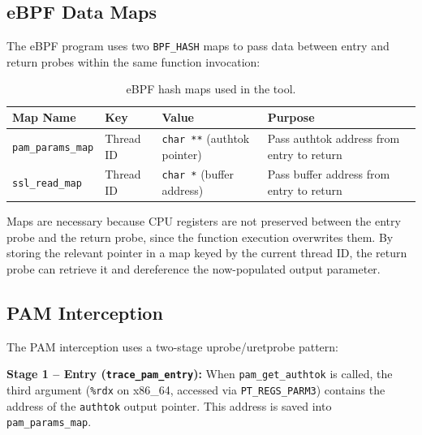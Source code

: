 \documentclass[11pt,a4paper]{article}
\begin{document}
\subsection{eBPF Data Maps}
\label{subsec:maps}

The eBPF program uses two \texttt{BPF\_HASH} maps to pass data between entry
and return probes within the same function invocation:

\begin{table}[H]
\centering
\caption{eBPF hash maps used in the tool.}
\label{tab:maps}
\begin{tabularx}{\textwidth}{@{}lllX@{}}
\toprule
\textbf{Map Name}      & \textbf{Key}  & \textbf{Value}      & \textbf{Purpose} \\
\midrule
\texttt{pam\_params\_map} & Thread ID & \texttt{char **} (authtok pointer) & Pass authtok address from entry to return \\
\texttt{ssl\_read\_map}   & Thread ID & \texttt{char *} (buffer address)   & Pass buffer address from entry to return \\
\bottomrule
\end{tabularx}
\end{table}

Maps are necessary because CPU registers are not preserved between the entry
probe and the return probe, since the function execution overwrites them. By storing
the relevant pointer in a map keyed by the current thread ID, the return probe
can retrieve it and dereference the now-populated output parameter.

\subsection{PAM Interception}
\label{subsec:pam_impl}

The PAM interception uses a two-stage uprobe/uretprobe pattern:

\textbf{Stage 1 -- Entry (\texttt{trace\_pam\_entry}):}
When \texttt{pam\_get\_authtok} is called, the third argument (\texttt{\%rdx}
on x86\_64, accessed via \texttt{PT\_REGS\_PARM3}) contains the address of the
\texttt{authtok} output pointer. This address is saved into
\texttt{pam\_params\_map}.
\end{document}
